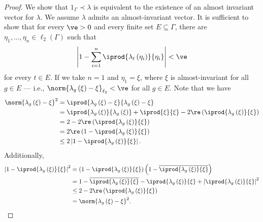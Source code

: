 \documentclass[10pt]{mypackage}
\begin{document}
\begin{proof}
  We show that $1_{\Gamma}\prec \lambda$ is equivalent to the existence of an almost invariant vector for $\lambda$. We assume $\lambda$ admits an almost-invariant vector. It is sufficient to show that for every $\ve > 0$ and every finite set $E\subseteq \Gamma$, there are $\eta_1,\dots,\eta_n\in \ell_2\left(\Gamma\right)$ such that
  \begin{align*}
    \left\vert 1-\sum_{i=1}^{n} \iprod{\lambda_t\left(\eta_i\right)}{\eta_i} \right\vert < \ve
  \end{align*}
  for every $t\in E$. If we take $n = 1$ and $\eta_1 = \xi$, where $\xi$ is almost-invariant for all $g\in E$ --- i.e., $\norm{\lambda_g\left(\xi\right) - \xi}_{\ell_2} < \ve$ for all $g\in E$. Note that we have
  \begin{align*}
    \norm{\lambda_g\left(\xi\right) - \xi}^2 &= \iprod{\lambda_g\left(\xi\right) - \xi}{\lambda_g\left(\xi\right) - \xi}\\
                                             &= \iprod{\lambda_g\left(\xi\right)}{\lambda_g\left(\xi\right)} + \iprod{\xi}{\xi} - 2\re\left( \iprod{\lambda_g\left(\xi\right)}{\xi}\right)\\
                                             &= 2 - 2\re\left( \iprod{\lambda_g\left(\xi\right)}{\xi}\right)\\
                                             &= 2\re\left(1 -  \iprod{\lambda_g\left(\xi\right)}{\xi}\right)\\
                                             &\leq 2\left\vert 1 - \iprod{\lambda_g\left(\xi\right)}{\xi} \right\vert.
  \end{align*}
  Additionally,
  \begin{align*}
    \left\vert 1- \iprod{\lambda_g\left(\xi\right)}{\xi} \right\vert^2 &= \left(1 - \iprod{\lambda_g\left(\xi\right)}{\xi}\right) \left( 1 - \overline{ \iprod{\lambda_g\left(\xi\right)}{\xi} } \right)\\
                                                                       &= 1 - \overline{ \iprod{\lambda_g\left(\xi\right)}{\xi} } - \iprod{\lambda_g\left(\xi\right)}{\xi} + \left\vert \iprod{\lambda_g\left(\xi\right)}{\xi} \right\vert^2\\
                                                                       &\leq 2 - 2\re\left( \iprod{\lambda_g\left(\xi\right)}{\xi}\right)\\
                                                                       &= \norm{\lambda_g\left(\xi\right) - \xi}^2.

\end{align*}
\end{proof}
\end{document}
